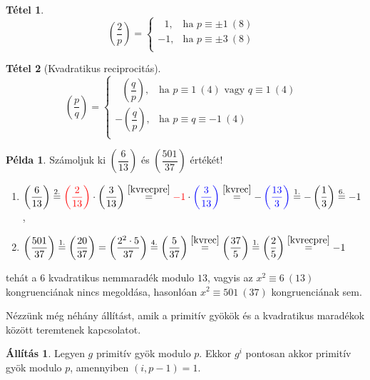 \documentclass[12pt]{book}
\theoremstyle{plain} %
\theoremstyle{definition} %
\newtheorem{all/}{Állítás}[section]
\newenvironment{all}
{\renewcommand{\qedsymbol}{$\clubsuit$}%
	\pushQED{\qed}\begin{all/}}
	{\popQED\end{all/}}
\newtheorem{pl}{Példa}[section]
\newtheorem{theo/}{Tétel}[section]
\newenvironment{theo}
  {\renewcommand{\qedsymbol}{$\clubsuit$}%
   \pushQED{\qed}\begin{theo/}}
  {\popQED\end{theo/}}
\theoremstyle{remark}
\renewcommand\qedsymbol{$\blacksquare$}
\numberwithin{equation}{section}  %
\begin{document}
	\begin{theo}\label{kvrecpre}
		\[ \left(\dfrac{2}{p}\right)= \begin{cases}
			\ \ \ 1, & \text{ha $p\equiv \pm1\ (8)$ } \\
			-1, & \text{ha $p\equiv \pm3\ (8)$} \\
			\end{cases} \]
	\end{theo}

	\begin{theo}[Kvadratikus reciprocitás]\label{kvrec}
		\[ \left(\dfrac{p}{q}\right) = \begin{cases}
		\ \ \ \left(\dfrac{q}{p}\right), & \text{ha $p\equiv 1\ (4)$ vagy $q\equiv 1\ (4)$ } \\
		-\left(\dfrac{q}{p}\right), & \text{ha $p\equiv q \equiv -1\ (4)$} \\
		\end{cases} \]
	\end{theo}

	\begin{pl}
		Számoljuk ki $\left(\dfrac{6}{13}\right)$ és $\left(\dfrac{501}{37}\right)$ értékét!
		
		\begin{enumerate}[label=(\alph*)]
			\item{$\left(\dfrac{6}{13}\right) \stackrel{2.}{=} \color{red} \left(\dfrac{2}{13}\right) \color{black} \cdot \left(\dfrac{3}{13}\right) \stackrel{\ref{kvrecpre}}{=} \color{red} -1 \color{black} \cdot \color{blue} \left(\dfrac{3}{13}\right) \color{black} \stackrel{\ref{kvrec}}{=} - \color{blue}  \left(\dfrac{13}{3}\right) \color{black} \stackrel{1.}{=} - \left(\dfrac{1}{3}\right) \stackrel{6.}{=} - 1 $, }
			\item{$\left(\dfrac{501}{37}\right) \stackrel{1.}{=} \left(\dfrac{20}{37}\right) = \left(\dfrac{2^2\cdot 5}{37}\right) \stackrel{4.}{=} \left(\dfrac{5}{37}\right) \stackrel{\ref{kvrec}}{=} \left(\dfrac{37}{5}\right) \stackrel{1.}{=} \left(\dfrac{2}{5}\right) \stackrel{\ref{kvrecpre}}{=} -1 $}
		\end{enumerate}
		tehát a $6$ kvadratikus nemmaradék modulo $13$, vagyis az $x^2\equiv 6\ (13)$ kongruenciának nincs megoldása, hasonlóan $x^2\equiv 501\ (37)$ kongruenciának sem.
	\end{pl}

	Nézzünk még néhány állítást, amik a primitív gyökök és a kvadratikus maradékok között teremtenek kapcsolatot.
	
	\begin{all}
		Legyen $g$ primitív gyök modulo $p$. Ekkor $g^i$ pontosan akkor primitív gyök modulo $p$, amennyiben $(i,p-1)=1$.
	\end{all}
	
\end{document}
